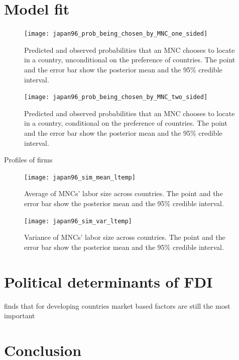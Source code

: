 \section{Model fit}
\label{sec:model_fit}

\begin{figure}[!ht] \centering
\texttt{[image: japan96\_prob\_being\_chosen\_by\_MNC\_one\_sided]}
  \caption{Predicted and observed probabilities that an MNC chooses to locate in
a country, unconditional on the preference of countries. The point and the error
bar show the posterior mean and the 95\% credible interval.}
  \label{fig:japan96_prob_being_chosen_by_MNC_one_sided}
\end{figure}


\begin{figure}[!ht] \centering
\texttt{[image: japan96\_prob\_being\_chosen\_by\_MNC\_two\_sided]}
  \caption{Predicted and observed probabilities that an MNC chooses to locate in
a country, conditional on the preference of countries. The point and the error
bar show the posterior mean and the 95\% credible interval.}
  \label{fig:japan96_prob_being_chosen_by_MNC_two_sided}
\end{figure}

Profiles of firms

\begin{figure}[!ht] \centering
\texttt{[image: japan96\_sim\_mean\_ltemp]}
  \caption{Average of MNCs' labor size across countries. The point and the error
bar show the posterior mean and the 95\% credible interval.}
  \label{fig:japan96_sim_mean_ltemp}
\end{figure}

\begin{figure}[!ht] \centering
\texttt{[image: japan96\_sim\_var\_ltemp]}
  \caption{Variance of MNCs' labor size across countries. The point and the
error bar show the posterior mean and the 95\% credible interval.}
  \label{fig:japan96_sim_var_ltemp}
\end{figure}

\section{Political determinants of FDI}

\citep{Nunnenkamp2002} finds that for developing countries market based factors
are still the most important

\section{Conclusion}
\label{sec:conclusion}

